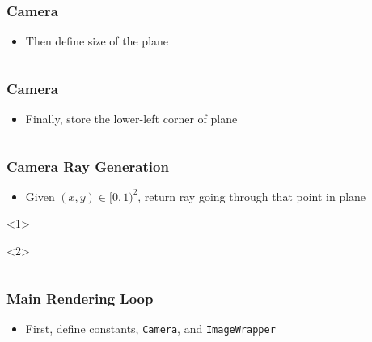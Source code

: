 \documentclass{beamer}
\begin{document}
\begin{frame}[fragile]
	\frametitle{Camera}
	\begin{itemize}
		\item Then define size of the plane
	\end{itemize}

	\inputminted[fontsize=\footnotesize]{python}{scripts/cameraConst2.py}
\end{frame}

\begin{frame}[fragile]
	\frametitle{Camera}
	\begin{itemize}
		\item Finally, store the lower-left corner of plane
	\end{itemize}

	\inputminted[fontsize=\footnotesize]{python}{scripts/cameraConst3.py}
\end{frame}

\begin{frame}[fragile]
	\frametitle{Camera Ray Generation}
	\begin{itemize}
		\item Given $(x, y)\in [0, 1)^2$, return ray going through that point in plane
	\end{itemize}
	\begin{onlyenv}
		\inputminted{python}{scripts/cameraGen.py}
	\end{onlyenv}
\end{frame}

\begin{frame}[fragile]
	\frametitle{Main Rendering Loop}
	\begin{itemize}
		\item First, define constants, \texttt{Camera}, and \texttt{ImageWrapper}
	\end{itemize}
	\inputminted[fontsize=\footnotesize]{python}{scripts/mainLoop1.py}
\end{frame}
\end{document}
